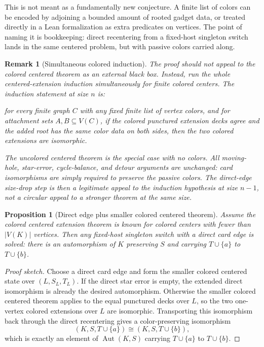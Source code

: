 \documentclass[11pt]{article}
\newtheorem{proposition}{Proposition}
\newtheorem{remark}{Remark}
\newcommand{\Aut}{\operatorname{Aut}}
\begin{document}
This is not meant as a fundamentally new conjecture.  A finite list of colors
can be encoded by adjoining a bounded amount of rooted gadget data, or treated
directly in a Lean formalization as extra predicates on vertices.  The point
of naming it is bookkeeping: direct recentering from a fixed-host singleton
switch lands in the same centered problem, but with passive colors carried
along.

\begin{remark}[Simultaneous colored induction]
The proof should not appeal to the colored centered theorem as an external
black box.  Instead, run the whole centered-extension induction
simultaneously for finite colored centers.  The induction statement at size
\(n\) is:

for every finite graph \(C\) with any fixed finite list of vertex colors, and
for attachment sets \(A,B\subseteq V(C)\), if the colored punctured extension
decks agree and the added root has the same color data on both sides, then
the two colored extensions are isomorphic.

The uncolored centered theorem is the special case with no colors.  All
moving-hole, star-error, cycle-balance, and detour arguments are unchanged:
card isomorphisms are simply required to preserve the passive colors.  The
direct-edge size-drop step is then a legitimate appeal to the induction
hypothesis at size \(n-1\), not a circular appeal to a stronger theorem at
the same size.
\end{remark}

\begin{proposition}[Direct edge plus smaller colored centered theorem]
Assume the colored centered extension theorem is known for colored centers
with fewer than \(|V(K)|\) vertices.  Then any fixed-host singleton switch
with a direct card edge is solved: there is an automorphism of \(K\) preserving
\(S\) and carrying \(T\cup\{a\}\) to \(T\cup\{b\}\).
\end{proposition}

\begin{proof}[Proof sketch]
Choose a direct card edge and form the smaller colored centered state over
\((L,S_L,T_L)\).  If the direct star error is empty, the extended direct
isomorphism is already the desired automorphism.  Otherwise the smaller
colored centered theorem applies to the equal punctured decks over \(L\), so
the two one-vertex colored extensions over \(L\) are isomorphic.  Transporting
this isomorphism back through the direct recentering gives a color-preserving
isomorphism
\[
  (K,S,T\cup\{a\})\cong (K,S,T\cup\{b\}),
\]
which is exactly an element of \(\Aut(K,S)\) carrying \(T\cup\{a\}\) to
\(T\cup\{b\}\).
\end{proof}
\end{document}

